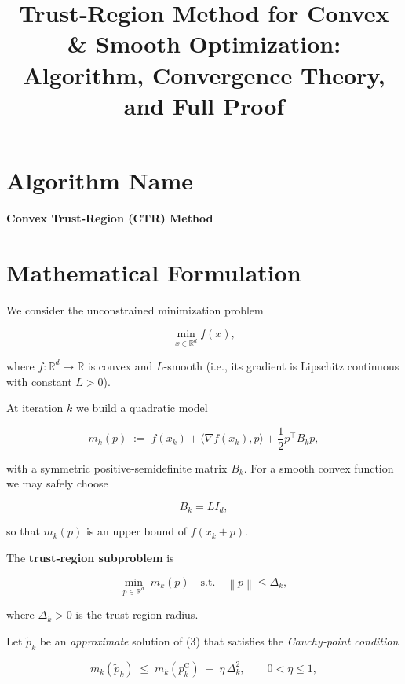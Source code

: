 \documentclass[11pt]{article}
\newcommand{\norm}[1]{\left\lVert #1\right\rVert}
\begin{document}
\title{Trust‑Region Method for Convex \& Smooth Optimization:\\ Algorithm, Convergence Theory, and Full Proof}
\author{}
\date{}
\maketitle

\tableofcontents

\section*{Algorithm Name}
\textbf{Convex Trust‑Region (CTR) Method}

\section{Mathematical Formulation}
We consider the unconstrained minimization problem  

\[
\min_{x\in\mathbb{R}^{d}} f(x),
\]

where \(f:\mathbb{R}^{d}\rightarrow\mathbb{R}\) is convex and \(L\)-smooth (i.e., its gradient is Lipschitz continuous with constant \(L>0\)).  

At iteration \(k\) we build a quadratic model  

\[
m_k(p) \;:=\; f(x_k) + \langle \nabla f(x_k),p\rangle + \frac12 p^{\top}B_k p,
\tag{1}
\]

with a symmetric positive‑semidefinite matrix \(B_k\).  
For a smooth convex function we may safely choose  

\[
B_k = L I_d,
\tag{2}
\]

so that \(m_k(p)\) is an upper bound of \(f(x_k+p)\).

The \textbf{trust‑region subproblem} is  

\[
\min_{p\in\mathbb{R}^{d}} \; m_k(p) \quad\text{s.t.}\quad \norm{p}\le \Delta_k,
\tag{3}
\]

where \(\Delta_k>0\) is the trust‑region radius.  

Let \(\tilde p_k\) be an \emph{approximate} solution of (3) that satisfies the \emph{Cauchy‑point condition}

\[
m_k(\tilde p_k) \;\le\; m_k(p_k^{\mathrm{C}}) \;-\; \eta \,\Delta_k^{2},
\qquad 0<\eta\le 1,
\tag{4}
\]
\end{document}
